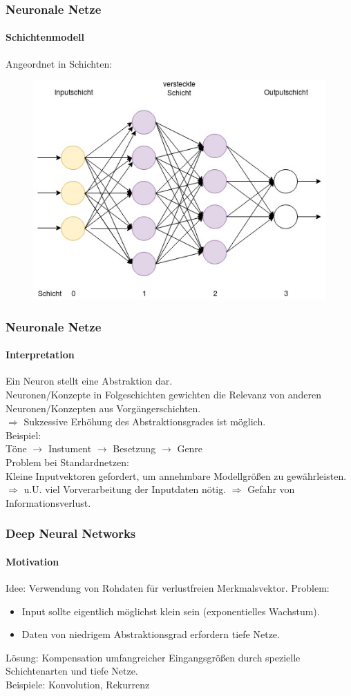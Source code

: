 \documentclass{beamer}
\begin{document}
\frame
{	
	\frametitle{Neuronale Netze}
	\framesubtitle{Schichtenmodell}
	Angeordnet in Schichten:
 	\begin{figure}[h!]
		\centering
		\includegraphics[width=0.8\linewidth,height=0.8\textheight, keepaspectratio]{res/old/Network.jpg}
	\end{figure}
}

\frame
{
	\frametitle{Neuronale Netze}
	\framesubtitle{Interpretation}
Ein Neuron stellt eine Abstraktion dar.\\
Neuronen/Konzepte in Folgeschichten gewichten die Relevanz von anderen Neuronen/Konzepten aus Vorgängerschichten.\\
$\Rightarrow$ Sukzessive Erhöhung des Abstraktionsgrades ist möglich.\\
Beispiel:\\
Töne $\rightarrow$ Instument $\rightarrow$ Besetzung $\rightarrow$ Genre\\
Problem bei Standardnetzen:\\
Kleine Inputvektoren gefordert, um annehmbare Modellgrößen zu gewährleisten.\\
$\Rightarrow$ u.U. viel Vorverarbeitung der Inputdaten nötig.
$\Rightarrow$ Gefahr von Informationsverlust.
}

\frame
{
	\frametitle{Deep Neural Networks}
	\framesubtitle{Motivation}
	Idee: Verwendung von Rohdaten für verlustfreien Merkmalsvektor.
	Problem: 
	\begin{itemize}
		\item Input sollte eigentlich möglichst klein sein (exponentielles Wachstum).
		\item Daten von niedrigem Abstraktionsgrad erfordern tiefe Netze.
	\end{itemize}
	Lösung: Kompensation umfangreicher Eingangsgrößen durch spezielle Schichtenarten und tiefe Netze.\\
	Beispiele: Konvolution, Rekurrenz
}
\end{document}
